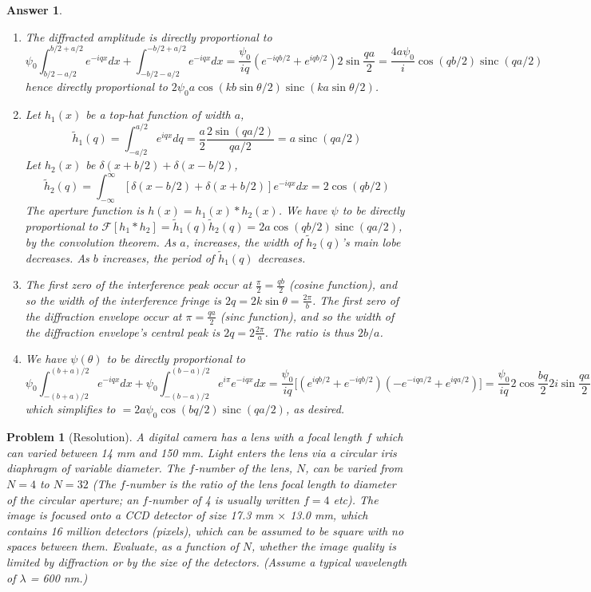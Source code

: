 \documentclass[a4paper]{article}
\DeclareMathOperator{\sinc}{sinc}
\newtheorem{ans}{Answer}[section]
\theoremstyle{new}
\newtheorem{qns}{Problem}[section]
\begin{document}
\begin{ans}\leavevmode
\begin{enumerate}[label=(\roman*)]
\item The diffracted amplitude is directly proportional to
$$\psi_0\int_{b/2-a/2}^{b/2+a/2}e^{-iqx}dx+\int_{-b/2-a/2}^{-b/2+a/2}e^{-iqx}dx=\frac{\psi_0}{iq}(e^{-iqb/2}+e^{iqb/2})2\sin\frac{qa}{2}=\frac{4a\psi_0}{i}\cos(qb/2)\sinc(qa/2)$$
hence directly proportional to $2\psi_0a\cos(kb\sin\theta/2)\sinc(ka\sin\theta/2)$.
\item Let $h_1(x)$ be a top-hat function of width $a$,
$$\tilde{h}_1(q)=\int_{-a/2}^{a/2}e^{iqx}dq=\frac{a}{2}\frac{2\sin(qa/2)}{qa/2}=a\sinc(qa/2)$$
Let $h_2(x)$ be $\delta(x+b/2)+\delta(x-b/2)$,
$$\tilde{h}_2(q)=\int_{-\infty}^\infty[\delta(x-b/2)+\delta(x+b/2)]e^{-iqx}dx=2\cos(qb/2)$$
The aperture function is $h(x)=h_1(x)*h_2(x)$. We have $\psi$ to be directly proportional to $\mathcal{F}[h_1*h_2]=\tilde{h}_1(q)\tilde{h}_2(q)=2a\cos(qb/2)\sinc(qa/2)$, by the convolution theorem. As $a$, increases, the width of $\tilde{h}_2(q)$'s main lobe decreases. As $b$ increases, the period of $\tilde{h}_1(q)$ decreases.
\item The first zero of the interference peak occur at $\frac{\pi}{2}=\frac{qb}{2}$ (cosine function), and so the width of the interference fringe is $2q=2k\sin\theta=\frac{2\pi}{b}$. The first zero of the diffraction envelope occur at $\pi=\frac{qa}{2}$ (sinc function), and so the width of the diffraction envelope's central peak is $2q=2\frac{2\pi}{a}$. The ratio is thus $2b/a$.
\item We have $\psi(\theta)$ to be directly proportional to
$$\psi_0\int_{-(b+a)/2}^{(b+a)/2}e^{-iqx}dx+\psi_0\int_{-(b-a)/2}^{(b-a)/2}e^{i\pi}e^{-iqx}dx=\frac{\psi_0}{iq}\bigg[(e^{iqb/2}+e^{-iqb/2})(-e^{-iqa/2}+e^{iqa/2})\bigg]=\frac{\psi_0}{iq}2\cos\frac{bq}{2}2i\sin\frac{qa}{2}$$
which simplifies to $=2a\psi_0\cos(bq/2)\sinc(qa/2)$, as desired.
\end{enumerate}
\end{ans}
\newpage
\begin{qns}[Resolution]
A digital camera has a lens with a focal length $f$ which can varied between 14 mm and 150 mm. Light enters the lens via a circular iris diaphragm of variable diameter. The $f$-number of the lens, $N$, can be varied from $N = 4$ to $N = 32$ (The $f$-number is the ratio of the lens focal length to diameter of the circular aperture; an $f$-number of 4 is usually written $f=4$ etc). The image is focused onto a CCD detector of size 17.3 mm $\times$ 13.0 mm, which contains 16 million detectors (pixels), which can be assumed to be square with no spaces between them. Evaluate, as a function of $N$, whether the image quality is limited by diffraction or by the size of the detectors. (Assume a typical wavelength
of $\lambda$ = 600 nm.)
\end{qns}
\end{document}
